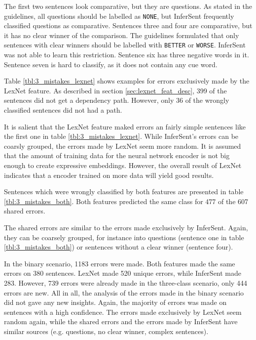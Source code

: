 The first two sentences look comparative, but they are questions. As stated in the guidelines, all questions should be labelled as \texttt{NONE}, but InferSent frequently classified questions as comparative. Sentences three and four are comparative, but it has no clear winner of the comparison. The guidelines formulated that only sentences with clear winners should be labelled with \texttt{BETTER} or \texttt{WORSE}. InferSent was not able to learn this restriction. Sentence six has three negative words in it. Sentence seven is hard to classify, as it does not contain any cue word.

Table \ref{tbl:3_mistakes_lexnet} shows examples for errors exclusively made by the LexNet feature. As described in section \ref{sec:lexnet_feat_desc}, 399 of the sentences did not get a dependency path. However, only 36 of the wrongly classified sentences did not had a path.

It is salient that the LexNet feature maked errors an fairly simple sentences like the first one in table \ref{tbl:3_mistakes_lexnet}. While InferSent's errors can be coarsly grouped, the errors made by LexNet seem more random. It is assumed that the amount of training data for the neural network encoder is not big enough to create expressive embeddings. However, the overall result of LexNet indicates that a encoder trained on more data will yield good results.

Sentences which were wrongly classified by both features are presented in table \ref{tbl:3_mistakes_both}. Both features predicted the same class for 477 of the 607 shared errors.

The shared errors are similar to the errors made exclusively by InferSent. Again, they can be coarsely grouped, for instance into questions (sentence one in table \ref{tbl:3_mistakes_both}) or sentences without a clear winner (sentence four).\newline

In the binary scenario, 1183 errors were made. Both features made the same errors on 380 sentences. LexNet made 520 unique errors, while InferSent made 283. However, 739 errors were already made in the three-class scenario, only 444 errors are new. All in all, the analysis of the errors made in the binary scenario did not gave any new insights. Again, the majority of errors was made on sentences with a high confidence. The errors made exclusively by LexNet seem random again, while the shared errors and the errors made by InferSent have similar sources (e.g. questions, no clear winner, complex sentences). %

